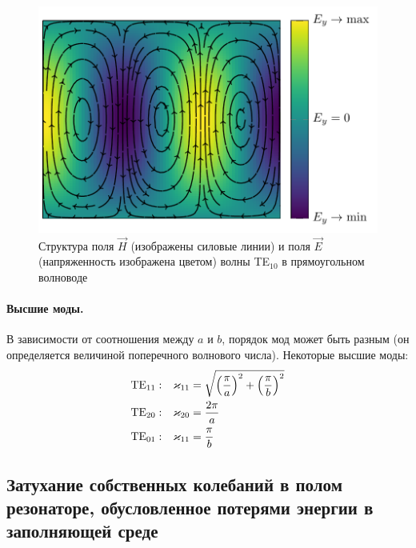 \begin{figure}[H]
	\centering
	\includegraphics[scale=1]{img/lect4_ris11}
	\caption{Структура поля $\vec{H}$ (изображены силовые линии) и поля $\vec{E}$ (напряженность изображена цветом) волны TE$_{10}$ в прямоугольном волноводе}
	\label{fig:lect4:11}
\end{figure}

\paragraph{Высшие моды.} В зависимости от соотношения между $a$ и $b$, порядок мод может быть разным (он определяется величиной поперечного волнового числа). Некоторые высшие моды:
\begin{equation}
\begin{aligned}
 		\text{TE}_{11}:& \quad  \varkappa_{11}=\sqrt{\qty(\frac{\pi}{a})^2+\qty(\frac{\pi}{b})^2}\\
 		\text{TE}_{20}:& \quad  \varkappa_{20}=\frac{2\pi}{a} \\
 		\text{TE}_{01}:& \quad  \varkappa_{11}=\frac{\pi}{b}
\end{aligned} 	
\end{equation} 


\subsection{Затухание собственных колебаний в полом резонаторе, обусловленное потерями энергии в заполняющей среде}